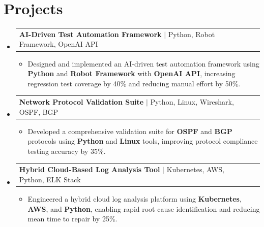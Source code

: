 \documentclass[letterpaper,10pt]{article}
\makeatletter
\newcommand{\resumeItem}[1]{
  \item{\fontsize{8pt}{9pt}\selectfont
    #1 \vspace{-3pt}
  }
}
\newcommand{\resumeProjectHeading}[2]{
    \item
    \begin{tabular*}{1.001\textwidth}{l@{\extracolsep{\fill}}r}
      \fontsize{8.5pt}{10pt}#1 & \textbf{\fontsize{8.5pt}{10pt} #2}\\
    \end{tabular*}\vspace{-7pt}
}
\newcommand{\resumeSubHeadingListStart}{\begin{itemize}[leftmargin=0pt, label={}]}
\newcommand{\resumeSubHeadingListEnd}{\end{itemize}}
\newcommand{\resumeItemListStart}{\begin{itemize}[leftmargin=*]}
\newcommand{\resumeItemListEnd}{\end{itemize}\vspace{-5pt}}
\makeatother
\begin{document}
\section{Projects}
    \vspace{-5pt}
    \resumeSubHeadingListStart
          \resumeProjectHeading
            {\textbf{AI-Driven Test Automation Framework} $|$ Python, Robot Framework, OpenAI API}{}
            \resumeItemListStart
                \resumeItem{Designed and implemented an AI-driven test automation framework using \textbf{Python} and \textbf{Robot Framework} with \textbf{OpenAI API}, increasing regression test coverage by 40\% and reducing manual effort by 50\%.}
            \resumeItemListEnd
        \vspace{-12pt}
    
        \resumeProjectHeading
            {\textbf{Network Protocol Validation Suite} $|$ Python, Linux, Wireshark, OSPF, BGP}{}
        \resumeItemListStart
                \resumeItem{Developed a comprehensive validation suite for \textbf{OSPF} and \textbf{BGP} protocols using \textbf{Python} and \textbf{Linux} tools, improving protocol compliance testing accuracy by 35\%.}
        \resumeItemListEnd
      \vspace{-12pt}
      \resumeProjectHeading
        {\textbf{Hybrid Cloud-Based Log Analysis Tool} $|$ Kubernetes, AWS, Python, ELK Stack}{}
    \resumeItemListStart
            \resumeItem{Engineered a hybrid cloud log analysis platform using \textbf{Kubernetes}, \textbf{AWS}, and \textbf{Python}, enabling rapid root cause identification and reducing mean time to repair by 25\%.}
    \resumeItemListEnd
    \resumeSubHeadingListEnd
\end{document}
